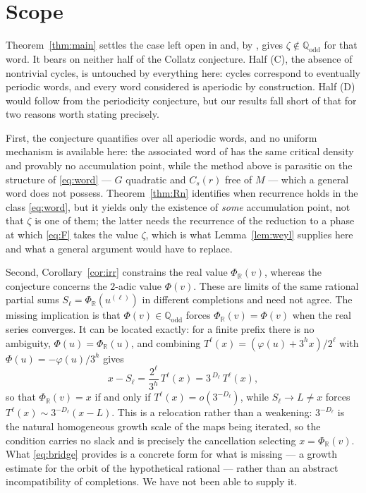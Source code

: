 \documentclass[11pt,a4paper]{article}
\theoremstyle{plain}
\theoremstyle{definition}
\newcommand{\R}{\mathbb{R}}
\newcommand{\Qodd}{\mathbb{Q}_{\mathrm{odd}}}
\begin{document}
\section{Scope}\label{sec:scope}

Theorem~\ref{thm:main} settles the case left open in \cite{LS} and, by \cite[p.~3]{LS}, gives
$\zeta\notin\Qodd$ for that word. It bears on neither half of the Collatz conjecture. Half (C), the
absence of nontrivial cycles, is untouched by everything here: cycles correspond to eventually
periodic words, and every word considered is aperiodic by construction. Half (D) would follow from
the periodicity conjecture, but our results fall short of that for two reasons worth stating
precisely.

First, the conjecture quantifies over all aperiodic words, and no uniform mechanism is available
here: the associated word of \cite[Example 7]{LS} has the same critical density and provably no
accumulation point, while the method above is parasitic on the structure of \eqref{eq:word} --- $G$
quadratic and $C_s(r)$ free of $M$ --- which a general word does not possess. Theorem~\ref{thm:Rn}
identifies when recurrence holds in the class \eqref{eq:word}, but it yields only the existence of
\emph{some} accumulation point, not that $\zeta$ is one of them; the latter needs the recurrence of
the reduction to a phase at which \eqref{eq:F} takes the value $\zeta$, which is what
Lemma~\ref{lem:weyl} supplies here and what a general argument would have to replace.

Second, Corollary~\ref{cor:irr} constrains the real value $\Phi_\R(v)$, whereas the conjecture
concerns the $2$-adic value $\Phi(v)$. These are limits of the same rational partial sums
$S_\ell=\Phi_\R(u^{(\ell)})$ in different completions and need not agree. The missing implication is
that $\Phi(v)\in\Qodd$ forces $\Phi_\R(v)=\Phi(v)$ when the real series converges. It can be located
exactly: for a finite prefix there is no ambiguity, $\Phi(u)=\Phi_\R(u)$, and combining
$T^\ell(x)=(\varphi(u)+3^hx)/2^\ell$ with $\Phi(u)=-\varphi(u)/3^h$ gives
\begin{equation}\label{eq:bridge}
   x-S_\ell=\frac{2^\ell}{3^h}\,T^\ell(x)=3^{\,D_\ell}\,T^\ell(x),
\end{equation}
so that $\Phi_\R(v)=x$ if and only if $T^\ell(x)=o(3^{-D_\ell})$, while $S_\ell\to L\ne x$ forces
$T^\ell(x)\sim3^{-D_\ell}(x-L)$. This is a relocation rather than a weakening: $3^{-D_\ell}$ is the
natural homogeneous growth scale of the maps being iterated, so the condition carries no slack and
is precisely the cancellation selecting $x=\Phi_\R(v)$. What \eqref{eq:bridge} provides is a
concrete form for what is missing --- a growth estimate for the orbit of the hypothetical rational
--- rather than an abstract incompatibility of completions. We have not been able to supply it.
\end{document}
